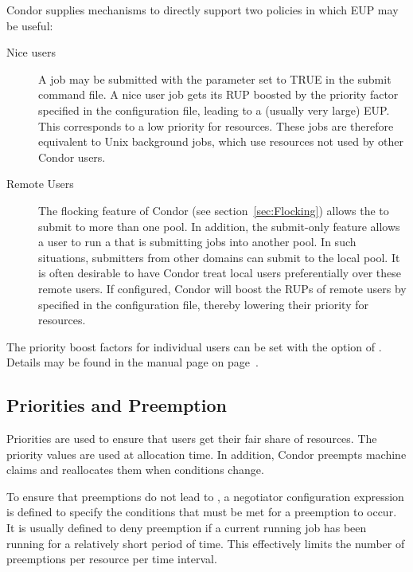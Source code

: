 
Condor supplies mechanisms to directly support two policies in which EUP may
be useful:
\begin{description}
	\item[Nice users]  A job may be submitted with the parameter 
	 set to TRUE in the submit command file.
	A nice user job gets its RUP boosted by the 
	 priority factor specified in the 
	configuration file, leading to a (usually very large) EUP.
	This corresponds to a low priority for resources.
	These jobs are therefore equivalent to Unix background jobs,
	which use resources not used by other Condor users.

	\item[Remote Users] The flocking feature of Condor (see
	section~\ref{sec:Flocking}) allows the  to
	submit to more than one pool.
	In addition, the submit-only feature allows a user to run a
	 that is submitting jobs into another pool.
	In such situations, submitters from other domains
	can submit to the local pool.
	It is often desirable to have Condor treat local users
	preferentially over these remote users.
	If configured, Condor will boost the RUPs of remote users by
	specified in the configuration file,
	thereby lowering their priority for resources.
\end{description}

The priority boost factors for individual users can be set with the 
 option of .
Details may be found in the  manual page 
on page~\pageref{man-condor-userprio}.

\subsection{Priorities and Preemption}
Priorities are used to ensure that users get their fair share of resources.  
The priority values are used at allocation time.
In addition, Condor preempts machine claims and reallocates them when
conditions change.

To ensure that preemptions do not lead to , a
 negotiator configuration expression is
defined to specify the conditions that must be met for a preemption to
occur.  It is usually defined to deny preemption if a current running
job has been running for a relatively short period of time.  This
effectively limits the number of preemptions per resource per time
interval.

